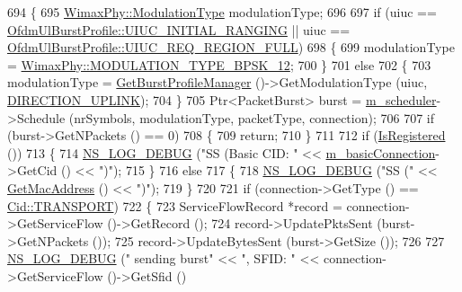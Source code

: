 \begin{DoxyCode}
694 \{
695   \hyperlink{classns3_1_1WimaxPhy_a044c5d8a48ca992c39c2a946f6e755fa}{WimaxPhy::ModulationType} modulationType;
696 
697   \textcolor{keywordflow}{if} (uiuc == \hyperlink{classns3_1_1OfdmUlBurstProfile_ae528783c4b3c6700ff49dfd7a555cb3daaea7b6256d4bcd0125f0248c0560c94e}{OfdmUlBurstProfile::UIUC\_INITIAL\_RANGING} || uiuc == 
      \hyperlink{classns3_1_1OfdmUlBurstProfile_ae528783c4b3c6700ff49dfd7a555cb3daae074d10caa7fe18da973227c7f9942f}{OfdmUlBurstProfile::UIUC\_REQ\_REGION\_FULL})
698     \{
699       modulationType = \hyperlink{classns3_1_1WimaxPhy_a044c5d8a48ca992c39c2a946f6e755faaef0b78541d9b66d4e85780131e665028}{WimaxPhy::MODULATION\_TYPE\_BPSK\_12};
700     \}
701   \textcolor{keywordflow}{else}
702     \{
703       modulationType = \hyperlink{classns3_1_1WimaxNetDevice_adc0798ce5d154658179fcecaf5bc602f}{GetBurstProfileManager} ()->GetModulationType (uiuc, 
      \hyperlink{classns3_1_1WimaxNetDevice_a194b6cf7eb59582328eb2531dc9ed884ad37a477621d1df190ff8d8fb933349cd}{DIRECTION\_UPLINK});
704     \}
705   Ptr<PacketBurst> burst = \hyperlink{classns3_1_1SubscriberStationNetDevice_a38477cd45dd6e6ea0f259ebd33e40e1a}{m\_scheduler}->Schedule (nrSymbols, modulationType, packetType, 
      connection);
706 
707   \textcolor{keywordflow}{if} (burst->GetNPackets () == 0)
708     \{
709       \textcolor{keywordflow}{return};
710     \}
711 
712   \textcolor{keywordflow}{if} (\hyperlink{classns3_1_1SubscriberStationNetDevice_ad88fedaf8b13d09d0c0d9aa0e52dc1b0}{IsRegistered} ())
713     \{
714       \hyperlink{group__logging_ga413f1886406d49f59a6a0a89b77b4d0a}{NS\_LOG\_DEBUG} (\textcolor{stringliteral}{"SS (Basic CID: "} << \hyperlink{classns3_1_1SubscriberStationNetDevice_ae166a9acaa0e8d720a106491ba9ea2fc}{m\_basicConnection}->GetCid () << \textcolor{stringliteral}{")"});
715     \}
716   \textcolor{keywordflow}{else}
717     \{
718       \hyperlink{group__logging_ga413f1886406d49f59a6a0a89b77b4d0a}{NS\_LOG\_DEBUG} (\textcolor{stringliteral}{"SS ("} << \hyperlink{classns3_1_1WimaxNetDevice_aa02eb7f6de9c03f0b8f2e33e3c5b5559}{GetMacAddress} () << \textcolor{stringliteral}{")"});
719     \}
720 
721   \textcolor{keywordflow}{if} (connection->GetType () == \hyperlink{classns3_1_1Cid_a10b8f92080ca5790e65a0bfa2f557e0aa46fbed56841c3bf471aa84de022edf87}{Cid::TRANSPORT})
722     \{
723       ServiceFlowRecord *record = connection->GetServiceFlow ()->GetRecord ();
724       record->UpdatePktsSent (burst->GetNPackets ());
725       record->UpdateBytesSent (burst->GetSize ());
726 
727       \hyperlink{group__logging_ga413f1886406d49f59a6a0a89b77b4d0a}{NS\_LOG\_DEBUG} (\textcolor{stringliteral}{" sending burst"} << \textcolor{stringliteral}{", SFID: "} << connection->GetServiceFlow ()->GetSfid ()

\end{DoxyCode}
